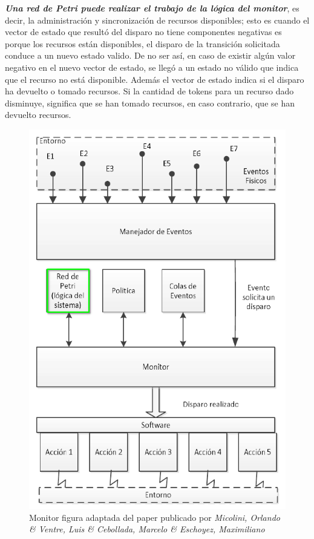 \par \textbf{\textit{Una red de Petri puede realizar el trabajo de la lógica del monitor}}, es decir, la administración y sincronización de recursos disponibles; esto es cuando el vector de estado que resultó del disparo no tiene componentes negativas es porque los recursos están disponibles, el disparo de la transición solicitada conduce a un nuevo estado valido. De no ser así, en caso de existir algún valor negativo en el nuevo vector de estado, se llegó a un estado no válido que indica que el recurso no está disponible. Además el vector de estado indica si el disparo ha devuelto o tomado recursos. Si la cantidad de tokens para un recurso dado disminuye, significa que se han tomado recursos, en caso contrario, que se han devuelto recursos.

\begin{figure}[H]
    \centering
    \includegraphics[scale=0.5]{images/monitor_mico_1.png}
    \caption[Monitor.]{Monitor figura adaptada del paper publicado por \textit{Micolini, Orlando \& Ventre, Luis \& Cebollada, Marcelo \& Eschoyez, Maximiliano}}
    \label{fig:monitormico1}
\end{figure}

